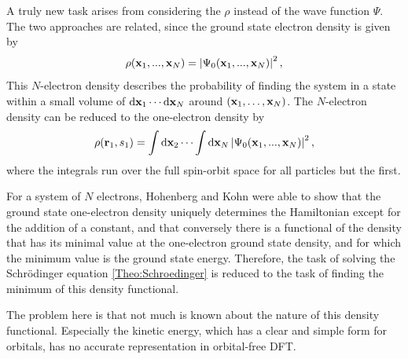 A truly new task arises from considering the  $\rho$ instead of the wave function
$\Psi$. The two approaches are related, since the ground state electron density is given by
\begin{equation}
 \rho(\mathbf{x}_1,...,\mathbf{x}_N)=\left|{\Psi_0(\mathbf{x}_1,...,\mathbf{x}_N)}\right|^2,
 \label{Theo:NElectronDensity}
\end{equation}
This $N$-electron density describes the probability of finding the system in a state within 
a small volume of $\text{d} \mathbf{x}_1 \cdots \text{d} \mathbf{x}_N$ around $(\mathbf{x}_1,\ldots,\mathbf{x}_N)$. 
The $N$-electron density can be reduced to the one-electron density by
\begin{equation}
 \rho(\mathbf{r}_1,s_1)=\int\text{d}\mathbf{x}_2 \cdots \int\text{d} \mathbf{x}_N \left|{\Psi_0(\mathbf{x}_1,...,\mathbf{x}_N)}\right|^2,
 \label{Theo:1ElectronDensity}
\end{equation}
where the integrals run over %
the full spin-orbit space for all particles but the first.

For a system of $N$ electrons, Hohenberg and Kohn were able to show that the
ground state one-electron density uniquely determines the Hamiltonian except
for the addition of a constant, and that conversely there is a functional of
the density that has its minimal value at the one-electron ground state
density, and for which the minimum value is the ground state
energy.\cite{HohenbergKohn1964} Therefore, the task of solving the Schrödinger
equation \eqref{Theo:Schroedinger} is reduced to the task of finding the
minimum of this density functional.

The problem here is that not much is known about the nature of this density
functional. Especially the kinetic energy, which has a clear and simple form
for orbitals, has no accurate representation in orbital-free DFT.

